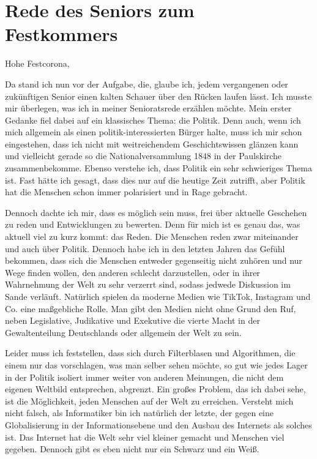 \section{Rede des Seniors zum Festkommers}
Hohe Festcorona,
\begin{multicols}{2}
Da stand ich nun vor der Aufgabe, die,
glaube ich, jedem vergangenen oder zukünftigen Senior einen kalten Schauer über
den Rücken laufen lässt. Ich musste mir überlegen, was ich in meiner
Senioratsrede erzählen möchte. Mein erster Gedanke fiel dabei auf ein
klassisches Thema: die Politik. Denn auch, wenn ich mich allgemein als einen
politik-interessierten Bürger halte, muss ich mir schon eingestehen, dass ich
nicht mit weitreichendem Geschichtswissen glänzen kann und vielleicht gerade so
die Nationalversammlung 1848 in der Paulskirche zusammenbekomme. Ebenso
verstehe ich, dass Politik ein sehr schwieriges Thema ist. Fast hätte ich
gesagt, dass dies nur auf die heutige Zeit zutrifft, aber Politik hat die
Menschen schon immer polarisiert und in Rage gebracht.

Dennoch dachte ich mir, dass es möglich sein muss, frei über aktuelle
Geschehen zu reden und Entwicklungen zu bewerten. Denn für mich ist es genau
das, was aktuell viel zu kurz kommt: das Reden. Die Menschen reden zwar
miteinander und auch über Politik. Dennoch habe ich in den letzten Jahren das
Gefühl bekommen, dass sich die Menschen entweder gegenseitig nicht zuhören und
nur Wege finden wollen, den anderen schlecht darzustellen, oder in ihrer
Wahrnehmung der Welt zu sehr verzerrt sind, sodass jedwede Diskussion im Sande
verläuft. Natürlich spielen da moderne Medien wie TikTok, Instagram und Co.
eine maßgebliche Rolle. Man gibt den Medien nicht ohne Grund den Ruf, neben
Legislative, Judikative und Exekutive die vierte Macht in der Gewaltenteilung
Deutschlands oder allgemein der Welt zu sein.

Leider muss ich feststellen, dass sich durch Filterblasen und Algorithmen,
die einem nur das vorschlagen, was man selber sehen möchte, so gut wie jedes
Lager in der Politik isoliert immer weiter von anderen Meinungen, die nicht dem
eigenen Weltbild entsprechen, abgrenzt. Ein großes Problem, das ich dabei sehe,
ist die Möglichkeit, jeden Menschen auf der Welt zu erreichen. Versteht mich
nicht falsch, als Informatiker bin ich natürlich der letzte, der gegen eine
Globalisierung in der Informationsebene und den Ausbau des Internets als
solches ist. Das Internet hat die Welt sehr viel kleiner gemacht und Menschen
viel gegeben. Dennoch gibt es eben nicht nur ein Schwarz und ein Weiß.


\end{multicols}
